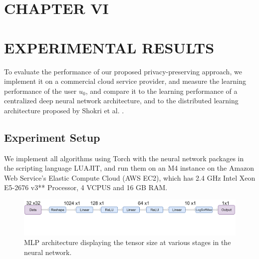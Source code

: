 \documentclass[letterpaper]{article}
\begin{document}
\begin{flushleft}
{%





\pagebreak
\section*{CHAPTER VI}
\vspace{0.25in}
\section{EXPERIMENTAL RESULTS}

To evaluate the performance of our proposed privacy-preserving approach, we implement it on a commercial cloud service provider, and measure the
learning performance of the user $u_0$, and compare it to the learning performance of a centralized deep neural network
architecture, and to the distributed learning architecture proposed by Shokri et al. \cite{shokri2015privacy}.

\subsection{Experiment Setup}
We implement all algorithms using Torch with the neural network packages in the scripting language LUAJIT, and run them on an M4
instance on the Amazon Web Service's Elastic Compute Cloud (AWS EC2), which has
2.4 GHz Intel Xeon E5-2676 v3** Processor, 4 VCPUS and 16 GB RAM.


\begin{figure}[H]
  \centering
    \includegraphics[width=6in]{MLPArchitecture.png}
    \caption[Tensor sizes in a MLP architecture.]{\label{fig:MLPArch} MLP architecture displaying the tensor size at various stages in the neural network.}
  \end{figure}


}
\end{flushleft}
\end{document}

